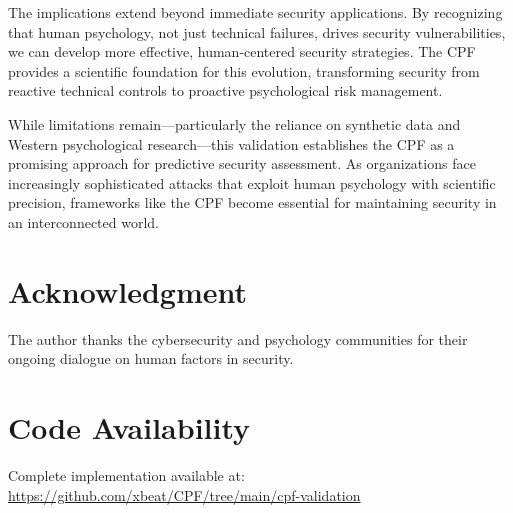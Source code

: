 \documentclass[10pt,twocolumn]{IEEEtran}
\begin{document}
The implications extend beyond immediate security applications. By recognizing that human psychology, not just technical failures, drives security vulnerabilities, we can develop more effective, human-centered security strategies. The CPF provides a scientific foundation for this evolution, transforming security from reactive technical controls to proactive psychological risk management.

While limitations remain---particularly the reliance on synthetic data and Western psychological research---this validation establishes the CPF as a promising approach for predictive security assessment. As organizations face increasingly sophisticated attacks that exploit human psychology with scientific precision, frameworks like the CPF become essential for maintaining security in an interconnected world.

\section*{Acknowledgment}

The author thanks the cybersecurity and psychology communities for their ongoing dialogue on human factors in security.

\section*{Code Availability}

Complete implementation available at: \url{https://github.com/xbeat/CPF/tree/main/cpf-validation}



\end{document}
